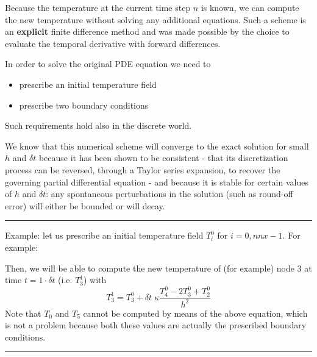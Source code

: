 Because the temperature at the current time step $n$ is known,
we can compute the new temperature without solving any additional equations.
Such a scheme is an {\bf explicit} finite difference method and
was made possible by the choice to evaluate the temporal derivative with forward differences.

\begin{center}

\end{center}

\noindent In order to solve the original PDE equation we need to
\begin{itemize}
\item prescribe an initial temperature field
\item prescribe two boundary conditions 
\end{itemize}
Such requirements hold also in the discrete world. 

We know that this numerical scheme will converge to the exact solution for
small $h$ and $\delta t$ because it has been shown to be {\color{olive}consistent} - 
that its discretization process
can be reversed, through a Taylor series expansion, to recover the governing partial differential equation -
and because it is {\color{olive}stable} for certain values of
$h$ and $\delta t$: any spontaneous perturbations in the solution (such as round-off error) 
will either be bounded or will decay.

\begin{center}
\begin{minipage}[t]{0.77\textwidth}
\par\noindent\rule{\textwidth}{0.4pt}
{\color{blue} Example}: let us prescribe an initial temperature field $T_i^0$ for $i=0,nnx-1$.
For example:

\begin{center}

\end{center}

Then, we will be able to compute the new temperature of (for example) 
node 3 at time $t=1\cdot \delta t$ 
(i.e. $T_3^1$) with 
\begin{equation}
T_3^{1}=T_3^0 + \delta t \; \kappa \frac{T_{4}^0 - 2T_3^0 + T_{2}^0}{h^2}
\end{equation}
Note that $T_0$ and $T_5$ cannot be computed by means of the above equation, 
which is not a problem because both these values are actually the prescribed 
boundary conditions. 

\par\noindent\rule{\textwidth}{0.4pt}
\end{minipage}
\end{center}

